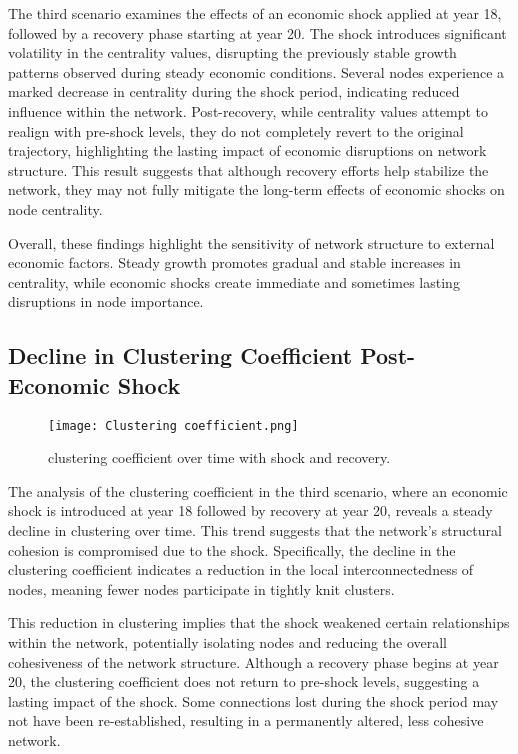 \documentclass{article} %
\begin{document}
The third scenario examines the effects of an economic shock applied at year 18, followed by a recovery phase starting at year 20. The shock introduces significant volatility in the centrality values, disrupting the previously stable growth patterns observed during steady economic conditions. Several nodes experience a marked decrease in centrality during the shock period, indicating reduced influence within the network. Post-recovery, while centrality values attempt to realign with pre-shock levels, they do not completely revert to the original trajectory, highlighting the lasting impact of economic disruptions on network structure. This result suggests that although recovery efforts help stabilize the network, they may not fully mitigate the long-term effects of economic shocks on node centrality.

Overall, these findings highlight the sensitivity of network structure to external economic factors. Steady growth promotes gradual and stable increases in centrality, while economic shocks create immediate and sometimes lasting disruptions in node importance.


\subsection{Decline in Clustering Coefficient Post-Economic Shock}


\begin{figure}[h]
    \begin{center}
        \texttt{[image: Clustering coefficient.png]}
    \end{center}
    \caption{clustering coefficient over time with shock and recovery.}
    \end{figure} 
The analysis of the clustering coefficient in the third scenario, where an economic shock is introduced at year 18 followed by recovery at year 20, reveals a steady decline in clustering over time. This trend suggests that the network’s structural cohesion is compromised due to the shock. Specifically, the decline in the clustering coefficient indicates a reduction in the local interconnectedness of nodes, meaning fewer nodes participate in tightly knit clusters.

This reduction in clustering implies that the shock weakened certain relationships within the network, potentially isolating nodes and reducing the overall cohesiveness of the network structure. Although a recovery phase begins at year 20, the clustering coefficient does not return to pre-shock levels, suggesting a lasting impact of the shock. Some connections lost during the shock period may not have been re-established, resulting in a permanently altered, less cohesive network.
\end{document}
